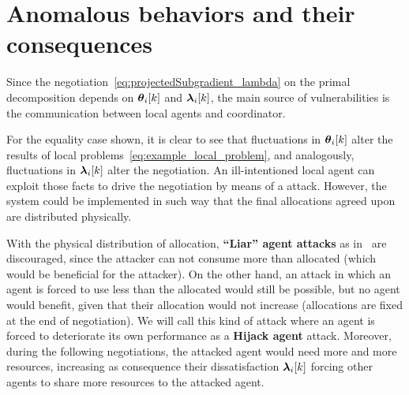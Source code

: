 \documentclass[../main.tex]{subfiles}
\begin{document}
\newpage
\section[Anomalous behaviors and their consequences]{Anomalous behaviors and their consequences}\label{sec:vulnerabilities_PD}

Since the negotiation~\eqref{eq:projectedSubgradient_lambda} on the primal decomposition depends on $\thetaik$ and $\lambdaik$, the main source of vulnerabilities is the communication between local agents and coordinator.

For the equality case shown, it is clear to see that fluctuations in $\thetaik$ alter the results of local problems~\eqref{eq:example_local_problem}, and analogously, fluctuations in $\lambdaik$ alter the negotiation.
An ill-intentioned local agent can exploit those facts to drive the negotiation by means of a \fdi{} attack.
However, the system could be implemented in such way that the final allocations agreed upon are distributed physically.

With the physical distribution of allocation, \textbf{``Liar'' agent attacks} as in~\cite{VelardeEtAl2017b} are discouraged, since the attacker can not consume more than allocated (which would be beneficial for the attacker).
On the other hand, an attack in which an agent is forced to use less than the allocated would still be possible, but no agent would benefit, given that their allocation would not increase (allocations are fixed at the end of negotiation).
We will call this kind of attack where an agent is forced to deteriorate its own performance as a \textbf{Hijack agent} attack.
Moreover, during the following negotiations, the attacked agent would need more and more resources, increasing as consequence their dissatisfaction $\lambdaik$ forcing other agents to share more resources to the attacked agent.
\end{document}
